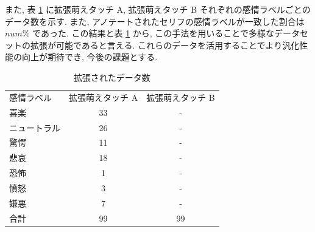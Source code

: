 \begin{table}[!h]
\vspace{10mm}
\caption{アノテートされたセリフと感情ラベルの例}
\label{table:aug_data}
\centering
{}
\vspace{1mm}
\end{table}

\newpage
また, 表 \ref{table:data_moe_aug} に拡張萌えタッチ A, 拡張萌えタッチ B それぞれの感情ラベルごとのデータ数を示す. また, アノテートされたセリフの感情ラベルが一致した割合は $num \%$ であった. この結果と表 \ref{table:data_moe_aug} から, この手法を用いることで多様なデータセットの拡張が可能であると言える. これらのデータを活用することでより汎化性能の向上が期待でき, 今後の課題とする.


\begin{table}[!h]
\vspace{20mm}
\begin{center}
\caption{拡張されたデータ数} %
\label{table:data_moe_aug} %
\begin{tabular}{lcc}
\hline
\multirow{2}{*}{感情ラベル} & \multirow{2}{*}{拡張萌えタッチ A} & \multirow{2}{*}{拡張萌えタッチ B} \\
 &  &  \\ \hline
喜楽 & 33 & - \\ \hline
ニュートラル & 26 & - \\
驚愕 & 11 & - \\
悲哀 & 18 & - \\
恐怖 & 1 & - \\
憤怒 & 3 & - \\
嫌悪 & 7 & - \\ \hline
合計 & 99 & 99
\end{tabular}
\end{center}
\vspace{10mm}
\end{table}

